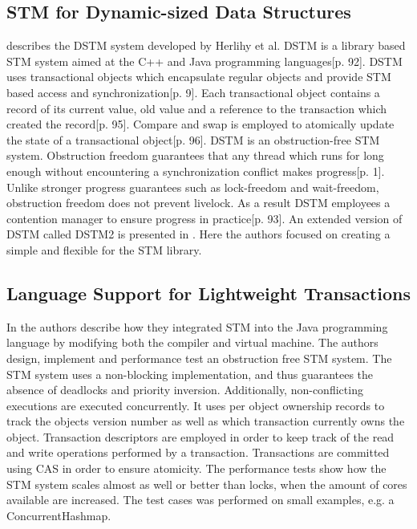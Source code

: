 \subsection{\ac{STM} for Dynamic-sized Data Structures}
\cite{herlihy2003software} describes the DSTM system developed by Herlihy et al. DSTM is a library based \ac{STM} system aimed at the C++ and Java programming languages\cite{herlihy2003software}[p. 92]. DSTM uses transactional objects which encapsulate regular objects and provide \ac{STM} based access and synchronization\cite{herlihy2003software}[p. 9]. Each transactional object contains a record of its current value, old value and a reference to the transaction which created the record\cite{herlihy2003software}[p. 95]. Compare and swap is employed to atomically update the state of a transactional object\cite{herlihy2003software}[p. 96]. DSTM is an obstruction-free\cite{herlihy2003obstruction} \ac{STM} system. Obstruction freedom guarantees that any thread which runs for long enough without encountering a synchronization conflict makes progress\cite{herlihy2003obstruction}[p. 1]. Unlike stronger progress guarantees such as lock-freedom and wait-freedom, obstruction freedom does not prevent livelock. As a result DSTM employees a contention manager to ensure progress in practice\cite{herlihy2003software}[p. 93]. An extended version of DSTM called DSTM2 is presented in \cite{herlihy2006flexible}. Here the authors focused on creating a simple and flexible  for the \ac{STM} library.

\subsection{Language Support for Lightweight Transactions}
In \cite{harris2003language} the authors describe how they integrated \ac{STM} into the Java programming language by modifying both the compiler\cite[p. 4]{harris2003language} and virtual machine\cite[p. 9]{harris2003language}. The authors design, implement and performance test an obstruction free \ac{STM} system. The \ac{STM} system uses a non-blocking implementation, and thus guarantees the absence of deadlocks and priority inversion. Additionally, non-conflicting executions are executed concurrently. It uses per object ownership records to track the objects version number as well as which transaction currently owns the object\cite[p. 6]{harris2003language}. Transaction descriptors are employed in order to keep track of the read and write operations performed by a transaction. Transactions are committed  using \ac{CAS} in order to ensure atomicity\cite[p. 7]{harris2003language}. The performance tests show how the \ac{STM} system scales almost as well or better than locks, when the amount of cores available are increased\cite[p. 12]{harris2003language}. The test cases was performed on small examples, e.g. a ConcurrentHashmap.

